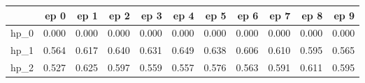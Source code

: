 \begin{tabular}{lrrrrrrrrrr}
\toprule
{} &   ep 0 &   ep 1 &   ep 2 &   ep 3 &   ep 4 &   ep 5 &   ep 6 &   ep 7 &   ep 8 &   ep 9 \\
\midrule
hp\_0 &  0.000 &  0.000 &  0.000 &  0.000 &  0.000 &  0.000 &  0.000 &  0.000 &  0.000 &  0.000 \\
hp\_1 &  0.564 &  0.617 &  0.640 &  0.631 &  0.649 &  0.638 &  0.606 &  0.610 &  0.595 &  0.565 \\
hp\_2 &  0.527 &  0.625 &  0.597 &  0.559 &  0.557 &  0.576 &  0.563 &  0.591 &  0.611 &  0.595 \\
\bottomrule
\end{tabular}
